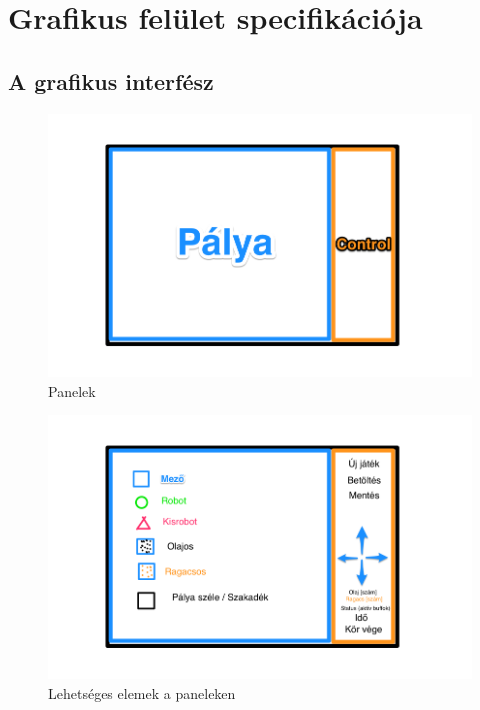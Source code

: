 %
\chapter{Grafikus felület specifikációja}

\thispagestyle{fancy}

\section{A grafikus interfész}

\begin{figure}[h!]
\begin{center}
\includegraphics[width=17cm]{chapters/chapter11/1.png}
\caption{Panelek}
\label{fig:Grafikus}
\end{center}
\end{figure}

\begin{figure}[h!]
\begin{center}
\includegraphics[width=17cm]{chapters/chapter11/2.png}
\caption{Lehetséges elemek a paneleken}
\label{fig:Grafikus}
\end{center}
\end{figure}

